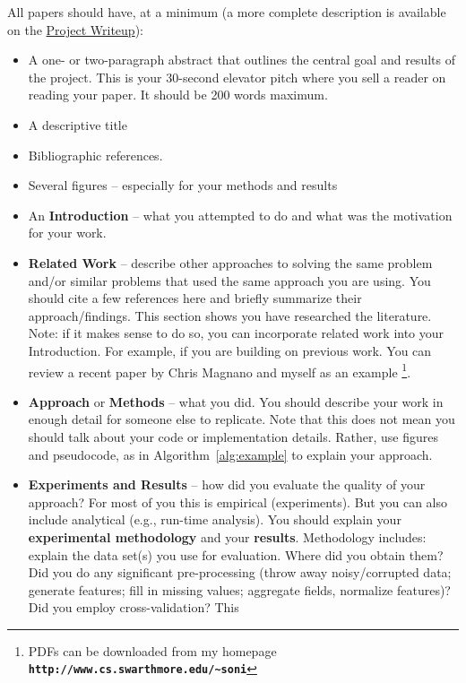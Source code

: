 \documentclass{article}
\begin{document}
All papers should have, at a minimum (a more complete description is
available on the \href{https://www.cs.swarthmore.edu/\~{}soni/cs68/s17/Labs/project.html}{Project Writeup}):
\begin{itemize}
  \item A one- or two-paragraph abstract that outlines the central goal and
    results of the project.  This is your 30-second elevator pitch where you
    sell a reader on reading your paper.  It should be 200 words maximum.
  \item A descriptive title
  \item Bibliographic references.
  \item Several figures -- especially for your methods and results
  \item An {\bf Introduction} -- what you attempted to do and what
    was the motivation for your work.
  \item {\bf Related Work} -- describe other approaches to solving the
    same problem and/or similar problems that used the same approach you are
    using.   You should cite a few references here and briefly summarize their
    approach/findings.  This section shows you have researched the literature.
    Note: if it makes sense to do so, you can incorporate related work
    into your Introduction.  For example, if you are building on previous work.
    You can review a recent paper by Chris Magnano and myself as an example \cite{magnano.sdm14}\footnote{PDFs can be downloaded from my homepage
    \textbf{\texttt{http://www.cs.swarthmore.edu/\~{}soni}}}.
  \item   {\bf Approach} or {\bf Methods} -- what you did.  You should describe
    your work in enough detail for someone else to replicate.  Note that this
    does not mean you should talk about your code or implementation details.
    Rather, use figures and pseudocode, as in Algorithm~\ref{alg:example} to explain your
    approach.
  \item {\bf Experiments and Results} -- how did you evaluate the quality of your approach?
    For most of you this is empirical (experiments).  But you can also
    include analytical (e.g., run-time analysis).  You should explain
    your {\bf experimental methodology} and your {\bf results}.
    Methodology includes: explain the data set(s) you use for evaluation.
    Where did you obtain them? Did you do any significant pre-processing (throw
    away noisy/corrupted data; generate features; fill in missing values;
    aggregate fields, normalize features)?  Did you employ cross-validation? This

\end{itemize}
\end{document}

